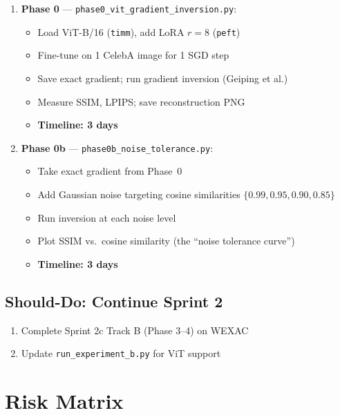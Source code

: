 \documentclass[11pt,a4paper]{article}
\begin{document}
\begin{enumerate}
    \item \textbf{Phase 0} --- \texttt{phase0\_vit\_gradient\_inversion.py}:
    \begin{itemize}[nosep]
        \item Load ViT-B/16 (\texttt{timm}), add LoRA $r\!=\!8$ (\texttt{peft})
        \item Fine-tune on 1 CelebA image for 1 SGD step
        \item Save exact gradient; run gradient inversion (Geiping et al.)
        \item Measure SSIM, LPIPS; save reconstruction PNG
        \item \textbf{Timeline: 3 days}
    \end{itemize}

    \item \textbf{Phase 0b} --- \texttt{phase0b\_noise\_tolerance.py}:
    \begin{itemize}[nosep]
        \item Take exact gradient from Phase~0
        \item Add Gaussian noise targeting cosine similarities $\{0.99, 0.95, 0.90, 0.85\}$
        \item Run inversion at each noise level
        \item Plot SSIM vs.\ cosine similarity (the ``noise tolerance curve'')
        \item \textbf{Timeline: 3 days}
    \end{itemize}
\end{enumerate}

\subsection{Should-Do: Continue Sprint 2}

\begin{enumerate}[resume]
    \item Complete Sprint 2c Track B (Phase 3--4) on WEXAC
    \item Update \texttt{run\_experiment\_b.py} for ViT support
\end{enumerate}


\section{Risk Matrix}
\end{document}
